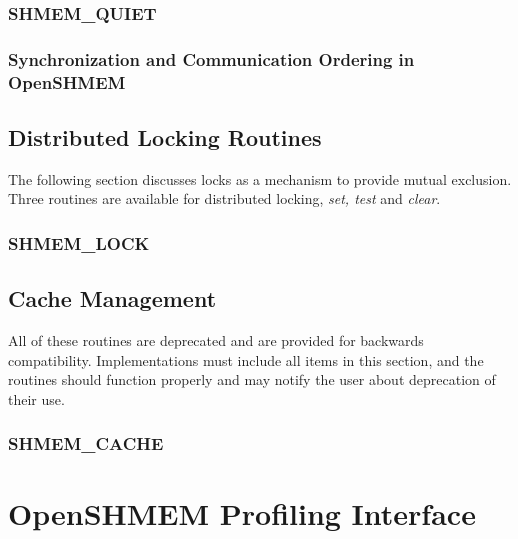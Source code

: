 \documentclass[10pt]{book}
\begin{document}
\subsubsection{\textbf{SHMEM\_QUIET}}\label{subsec:shmem_quiet}


\subsubsection{Synchronization and Communication Ordering in OpenSHMEM}







\subsection{Distributed Locking Routines}
The following section discusses \openshmem locks as a mechanism to provide
mutual exclusion. Three routines are available for distributed locking,
\textit{set, test} and \textit{clear}.

\subsubsection{\textbf{SHMEM\_LOCK}}\label{subsec:shmem_lock}






\subsection{Cache Management}
All of these routines are deprecated and are provided for backwards
compatibility.  Implementations must include all items in this section, and the
routines should function properly and may notify the user about deprecation of
their use.

\subsubsection{\textbf{SHMEM\_CACHE}}\label{subsec:shmem_cache}


\section{OpenSHMEM Profiling Interface}\label{sec:openshmem_profiling_interface}


\clearpage


\clearpage
{}
{}
\printindex
\end{document}
